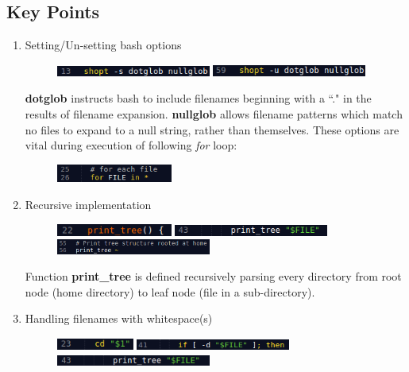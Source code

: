 \documentclass[12pt,a4paper]{article}
\begin{document}
\subsection{Key Points}
\begin{enumerate}
  \item Setting/Un-setting bash options
\begin{figure}[!h]
	\includegraphics[width=2in]{./task01/task01_1_1.png}
	\includegraphics[width=2in]{./task01/task01_1_2.png}
\end{figure}

\textbf{dotglob} instructs bash to include filenames beginning with a ``." in the results of filename expansion. \textbf{nullglob} allows filename patterns which match no files to expand to a null string, rather than themselves. These options are vital during execution of following \textit{for} loop:
\begin{figure}[!h]
	\includegraphics[width=1.5in]{./task01/task01_1_3.png}
\end{figure}

  \item Recursive implementation
\begin{figure}[!htb]
	\includegraphics[width=1.5in]{./task01/task01_2_1.png}
	\includegraphics[width=2in]{./task01/task01_2_2.png}
	\includegraphics[width=2in]{./task01/task01_2_3.png}
\end{figure}

Function \textbf{print\_tree} is defined recursively parsing every directory from root node (home directory) to leaf node (file in a sub-directory).

  \item Handling filenames with whitespace(s)
\begin{figure}[!h]
	\includegraphics[width=1in]{./task01/task01_3_1.png}
	\includegraphics[width=2in]{./task01/task01_3_2.png}
	\includegraphics[width=2in]{./task01/task01_3_3.png}
\end{figure}


\end{enumerate}
\end{document}
